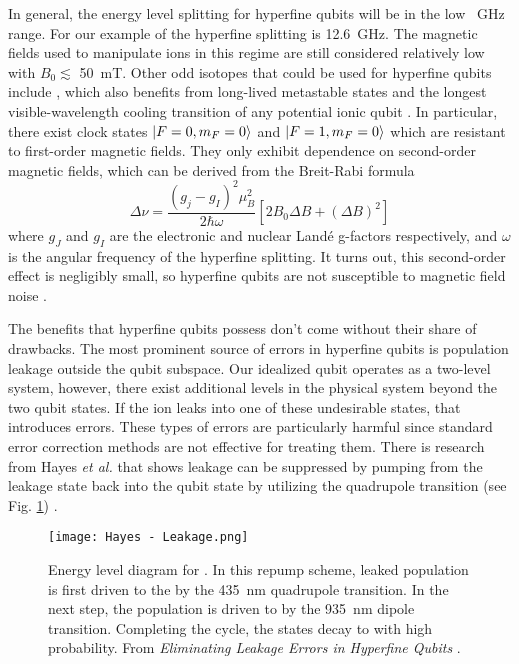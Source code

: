 In general, the energy level splitting for hyperfine qubits will be in the low \SI{}{\giga\hertz} range. For our example of  the hyperfine splitting is \SI{12.6}{\giga\hertz}. The magnetic fields used to manipulate ions in this regime are still considered relatively low with $B_0 \lesssim$ \SI{50}{\milli\tesla}. Other odd isotopes that could be used for hyperfine qubits include , which also benefits from long-lived metastable states and the longest visible-wavelength cooling transition of any potential ionic qubit \cite{Dietrich}. In particular, there exist clock states $\ket{F=0, m_F=0}$ and $\ket{F=1, m_F=0}$ which are resistant to first-order magnetic fields. They only exhibit dependence on second-order magnetic fields, which can be derived from the Breit-Rabi formula
\begin{equation}
    \Delta \nu = \frac{(g_j - g_I)^2 \mu_B^2}{2\hbar\omega} [2B_0 \Delta B + (\Delta B)^2]
\end{equation}
where $g_J$ and $g_I$ are the electronic and nuclear Land\'e g-factors respectively, and $\omega$ is the angular frequency of the hyperfine splitting. It turns out, this second-order effect is negligibly small, so hyperfine qubits are not susceptible to magnetic field noise \cite{Brown, Bruzewicz}.

The benefits that hyperfine qubits possess don't come without their share of drawbacks. The most prominent source of errors in hyperfine qubits is population leakage outside the qubit subspace. Our idealized qubit operates as a two-level system, however, there exist additional levels in the physical system beyond the two qubit states. If the ion leaks into one of these undesirable states, that introduces errors. These types of errors are particularly harmful since standard error correction methods are not effective for treating them. There is research from Hayes \textit{et al.} that shows leakage can be suppressed by pumping from the leakage state back into the qubit state by utilizing the quadrupole transition (see Fig. \ref{fig:Leakage}) \cite{Hayes}. 
\begin{figure}[ht]
    \texttt{[image: Hayes - Leakage.png]}
    \caption{Energy level diagram for . In this repump scheme, leaked population is first driven to the  by the \SI{435}{\nano\meter} quadrupole transition. In the next step, the population is driven to  by the \SI{935}{\nano\meter} dipole transition. Completing the cycle, the  states decay to  with high probability. From \textit{Eliminating Leakage Errors in Hyperfine Qubits} \cite{Hayes}.}
    \label{fig:Leakage}
\end{figure}


